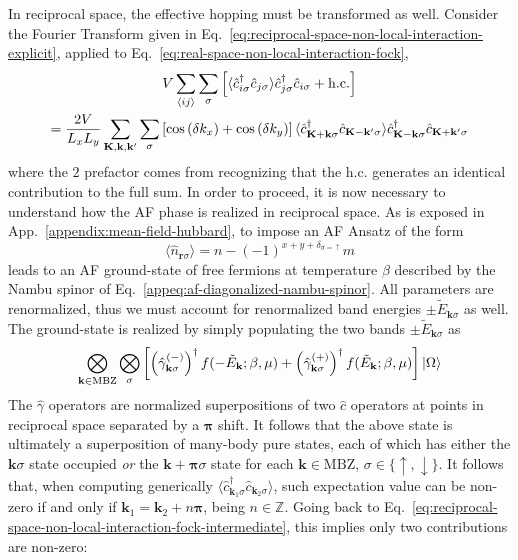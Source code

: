 In reciprocal space, the effective hopping must be transformed as well. Consider the Fourier Transform given in Eq.~\eqref{eq:reciprocal-space-non-local-interaction-explicit}, applied to Eq.~\eqref{eq:real-space-non-local-interaction-fock},
\begin{multline}
	V \sum_{\ev{ij}} \sum_\sigma \left[
		\langle
			\hat c_{i\sigma}^\dagger \hat c_{j\sigma}
		\rangle \hat c_{j\sigma}^\dagger  \hat c_{i\sigma} + \mathrm{h.c.}
	\right] \\
	= \frac{2V}{L_x L_y} \sum_{\mathbf{K}, \mathbf{k}, \mathbf{k}'} \sum_\sigma \left[
		\cos \left(
			\delta k_x
			\right)	+ \cos \left(
			\delta k_y
		\right)	
	\right]	
	\langle
		\hat c_{\mathbf{K}+\mathbf{k} \sigma}^\dagger 
		\hat c_{\mathbf{K}-\mathbf{k}' \sigma}
	\rangle
	\hat c_{\mathbf{K}-\mathbf{k} \sigma}^\dagger  \hat c_{\mathbf{K}+\mathbf{k}'\sigma} \label{eq:reciprocal-space-non-local-interaction-fock-intermediate}
\end{multline}
where the $2$ prefactor comes from recognizing that the $\mathrm{h.c.}$ generates an identical contribution to the full sum. In order to proceed, it is now necessary to understand how the AF phase is realized in reciprocal space. As is exposed in App.~\ref{appendix:mean-field-hubbard}, to impose an AF Ansatz of the form
\[
	\langle \hat n_{\mathbf{r}\sigma} \rangle = n - (-1)^{x+y+\delta_{\sigma=\uparrow}} m
\]
leads to an AF ground-state of free fermions at temperature $\beta$ described by the Nambu spinor of Eq.~\eqref{appeq:af-diagonalized-nambu-spinor}. All parameters are renormalized, thus we must account for renormalized band energies $\pm \tilde{E}_{\mathbf{k}\sigma}$ as well. The ground-state is realized by simply populating the two bands $\pm \tilde{E}_{\mathbf{k}\sigma}$ as
\[
	\bigotimes_{\mathbf{k}\in\mathrm{MBZ}} \bigotimes_\sigma \left[
		\left(\hat \gamma_{\mathbf{k}\sigma}^{(-)}\right)^\dagger f(-\tilde{E}_\mathbf{k};\beta,\mu) + \left(\hat \gamma_{\mathbf{k}\sigma}^{(+)}\right)^\dagger f(\tilde{E}_\mathbf{k};\beta,\mu)
	\right] \ket{\Omega}
\]
The $\hat\gamma$ operators are normalized superpositions of two $\hat c$ operators at points in reciprocal space separated by a $\bm{\pi}$ shift. It follows that the above state is ultimately a superposition of many-body pure states, each of which has either the $\mathbf{k}\sigma$ state occupied \textit{or} the $\mathbf{k}+\bm{\pi}\sigma$ state for each $\mathbf{k}\in\mathrm{MBZ}$, $\sigma\in\lbrace\uparrow,\downarrow\rbrace$. It follows that, when computing generically $\langle \hat c_{\mathbf{k}_1\sigma}^\dagger \hat c_{\mathbf{k}_2\sigma} \rangle$, such expectation value can be non-zero if and only if $\mathbf{k}_1 = \mathbf{k}_2 + n\bm{\pi}$, being $n \in \mathbb{Z}$. Going back to Eq.~\eqref{eq:reciprocal-space-non-local-interaction-fock-intermediate}, this implies only two contributions are non-zero:
